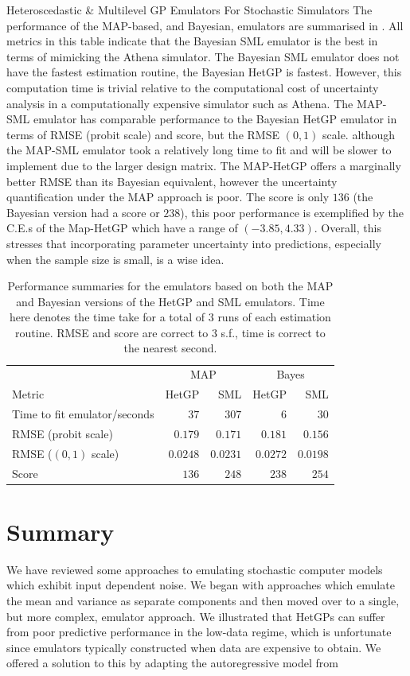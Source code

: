 \begin{chapter}{Heteroscedastic \& Multilevel GP Emulators For Stochastic Simulators\label{Ch:Hetsml}}
The performance of the MAP-based, and Bayesian, emulators are summarised in . All metrics in this table indicate that the Bayesian SML emulator is the best in terms of mimicking the Athena simulator. The Bayesian SML emulator does not have the fastest estimation routine, the Bayesian HetGP is fastest. However, this computation time is trivial relative to the computational cost of uncertainty analysis in a computationally expensive simulator such as Athena. The MAP-SML emulator has comparable performance to the Bayesian HetGP emulator in terms of RMSE (probit scale) and score, but the RMSE $(0,1)$ scale. although the MAP-SML emulator took a relatively long time to fit and will be slower to implement due to the larger design matrix. The MAP-HetGP offers a marginally better RMSE than its Bayesian equivalent, however the uncertainty quantification under the MAP approach is poor. The score is only $136$ (the Bayesian version had a score or $238$), this poor performance is exemplified by the C.E.s of the Map-HetGP which have a range of $(-3.85, 4.33)$. Overall, this stresses that incorporating parameter uncertainty into predictions, especially when the sample size is small, is a wise idea.

\begin{table}
	\centering
	\begin{tabular}{lrrrr}
		\toprule
		& \multicolumn{2}{c}{MAP} & \multicolumn{2}{c}{Bayes}\\
		Metric & HetGP & SML & HetGP & SML \\ \cmidrule{1-5}
		Time to fit emulator/seconds &$37$&$307$&$6$&$30$\\
		RMSE (probit scale)& $0.179$ & $0.171$&$0.181$&$0.156$\\
		RMSE ($(0,1)$ scale) &$0.0248$&$0.0231$&$0.0272$&$0.0198$\\
		Score &$136$&$248$&$238$&$254$\\\bottomrule
	\end{tabular}
	\caption{Performance summaries for the emulators based on both the MAP and Bayesian versions of the HetGP and SML emulators. Time here denotes the time take for a total of 3 runs of each estimation routine. RMSE and score are correct to $3$ s.f., time is correct to the nearest second.}
	\label{Tab:all-performance}
\end{table}
\section{Summary}
We have reviewed some approaches to emulating stochastic computer models which exhibit input dependent noise. We began with approaches which emulate the mean and variance as separate components and then moved over to a single, but more complex, emulator approach. We illustrated that HetGPs can suffer from poor predictive performance in the low-data regime, which is unfortunate since emulators typically constructed when data are expensive to obtain. We offered a solution to this by adapting the autoregressive model from \citet{Kennedy2000}


\end{chapter}
